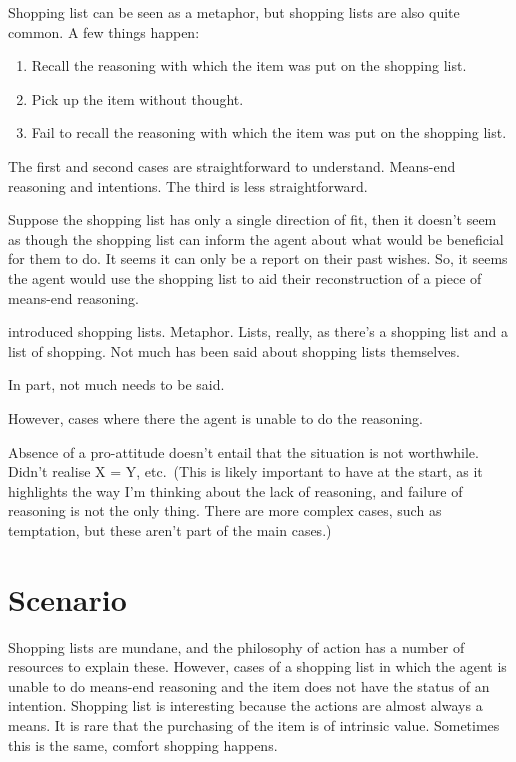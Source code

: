 \documentclass[10pt]{article}
\begin{document}
Shopping list can be seen as a metaphor, but shopping lists are also quite common.
A few things happen:
\begin{enumerate}
\item Recall the reasoning with which the item was put on the shopping list.
\item Pick up the item without thought.
\item Fail to recall the reasoning with which the item was put on the shopping list.
\end{enumerate}

The first and second cases are straightforward to understand.
Means-end reasoning and intentions.
The third is less straightforward.




Suppose the shopping list has only a single direction of fit, then it doesn't seem as though the shopping list can inform the agent about what would be beneficial for them to do.
It seems it can only be a report on their past wishes.
So, it seems the agent would use the shopping list to aid their reconstruction of a piece of means-end reasoning.

\newpage

\citeauthor{Anscombe:1957aa} introduced shopping lists.
Metaphor.
Lists, really, as there's a shopping list and a list of shopping.
Not much has been said about shopping lists themselves.

In part, not much needs to be said.

However, cases where there the agent is unable to do the reasoning.



Absence of a pro-attitude doesn't entail that the situation is not worthwhile.
Didn't realise X = Y, etc.\
(This is likely important to have at the start, as it highlights the way I'm thinking about the lack of reasoning, and failure of reasoning is not the only thing.
There are more complex cases, such as temptation, but these aren't part of the main cases.)

\section{Scenario}
\label{sec:scenario}

Shopping lists are mundane, and the philosophy of action has a number of resources to explain these.
However, cases of a shopping list in which the agent is unable to do means-end reasoning and the item does not have the status of an intention.
Shopping list is interesting because the actions are almost always a means.
It is rare that the purchasing of the item is of intrinsic value.
Sometimes this is the same, comfort shopping happens.
\end{document}
